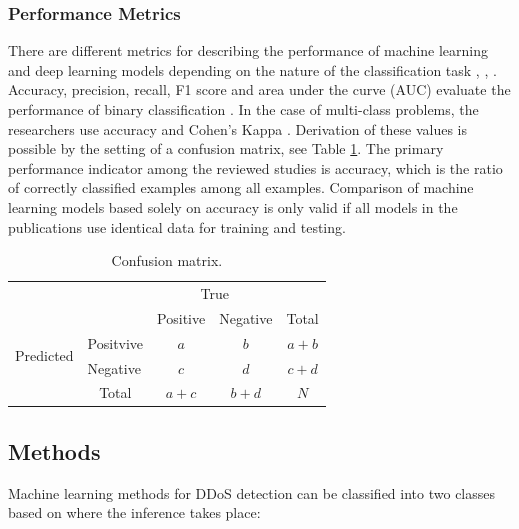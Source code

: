 \documentclass[conference, 11pt]{IEEEtran}
\begin{document}
    \subsubsection{Performance Metrics}
    There are different metrics for describing the performance of machine learning and deep learning models depending on the nature of the classification task \cite{Goodfellow-et-al-2016}, \cite{sokolova2009systematic}, \cite{garcia2009study} .
    Accuracy, precision, recall, F1 score and area under the curve (AUC) evaluate the performance of binary classification \cite{sokolova2009systematic}.
    In the case of multi-class problems, the researchers use accuracy and Cohen's Kappa \cite{garcia2009study}.
    Derivation of these values is possible by the setting of a confusion matrix, see Table \ref{tab:cm}.
    The primary performance indicator among the reviewed studies is accuracy, which is the ratio of correctly classified examples among all examples.
    Comparison of machine learning models based solely on accuracy is only valid if all models in the publications use identical data for training and testing.
    \begin{table}[htbp]
        \begin{tabular}{l|l|c|c|c}
            \multicolumn{2}{c}{} & \multicolumn{2}{c}{True} & \\
            \cline{3-4}
            \multicolumn{2}{c|}{} & Positive & Negative & \multicolumn{1}{c}{Total} \\
            \cline{2-4}
            \multirow{2}{*}{Predicted} & Positvive                 & $a$                       & $b$                       & $a+b$                   \\
            \cline{2-4}
            & Negative                  & $c$                       & $d$                       & $c+d$                   \\
            \cline{2-4}
            \multicolumn{1}{c}{}       & \multicolumn{1}{c}{Total} & \multicolumn{1}{c}{$a+c$} & \multicolumn{    1}{c}{$b+d$} & \multicolumn{1}{c}{$N$}\\
        \end{tabular}
        \caption{Confusion matrix.}
        \label{tab:cm}
    \end{table}

    \subsection{Methods}
    Machine learning methods for DDoS detection can be classified into two classes based on where the inference takes place:
\end{document}
